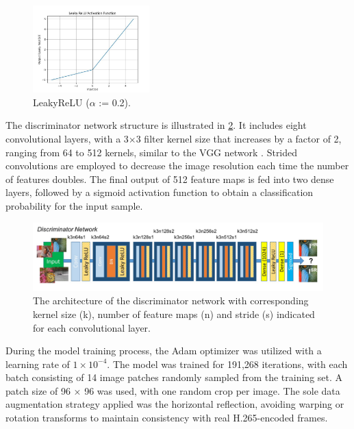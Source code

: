 \begin{figure}
\centering
\includegraphics[width=0.4\textwidth]{static/LeakyReLU.jpg}
\caption{LeakyReLU ($\alpha$ := 0.2).}
\label{fig:leakyrelu}
\end{figure}

The discriminator network structure is illustrated in \cref{fig:discriminator}. It includes eight convolutional layers, with a 3$\times$3 filter kernel size that increases by a factor of 2, ranging from 64 to 512 kernels, similar to the VGG network \cite{simonyan2014very}. Strided convolutions are employed to decrease the image resolution each time the number of features doubles. The final output of 512 feature maps is fed into two dense layers, followed by a sigmoid activation function to obtain a classification probability for the input sample.

\begin{figure}[ht]
\centering
\includegraphics[width=1.0\textwidth]{static/discriminator_architecture.png}
\caption{The architecture of the discriminator network with corresponding kernel size (k), number of feature maps (n) and stride (s) indicated for each convolutional layer.}
\label{fig:discriminator}
\end{figure}

During the model training process, the Adam optimizer was utilized with a learning rate of $1\times10^{-4}$. The model was trained for 191,268 iterations, with each batch consisting of 14 image patches randomly sampled from the training set. A patch size of 96 × 96 was used, with one random crop per image. The sole data augmentation strategy applied was the horizontal reflection, avoiding warping or rotation transforms to maintain consistency with real H.265-encoded frames.


